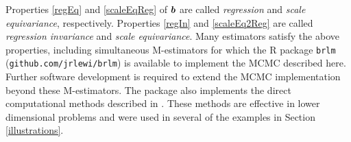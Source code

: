 \documentclass[ba]{imsart}
\makeatletter
\def\bbeta{\mbox{\boldmath $\beta$}}
\newcommand{\by}{\mbox{\boldmath $y$}}
\newcommand{\bv}{\mbox{\boldmath $v$}}
\newcommand{\bb}{\mbox{\boldmath $b$}}
\newcommand{\labitem}[2]{%
\def\@itemlabel{\textbf{#1}{.}}
\item
\def\@currentlabel{#1}\label{#2}}
\makeatother
\begin{document}
Properties \ref{regEq} and \ref{scaleEqReg} of $\bb$ are called
\textit{regression} and \textit{scale equivariance},
respectively.  Properties \ref{regIn} and \ref{scaleEq2Reg} are called \textit{regression invariance}
and \textit{scale equivariance}. 
Many estimators satisfy the above properties, including simultaneous M-estimators \citep{huber2009, maronna2006} for which the R package \texttt{brlm} (\texttt{github.com/jrlewi/brlm}) is available to implement the MCMC described here. Further software development is required to extend the MCMC implementation beyond these M-estimators. The package also implements the direct computational methods described in \cite{lewis2014}. These methods are effective in lower dimensional problems and were used in several of the examples in Section \ref{illustrations}.


%
\end{document}
